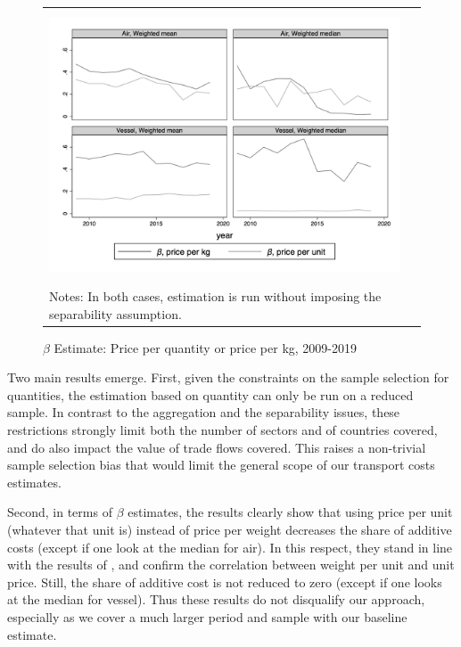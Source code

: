 \documentclass[11pt,twoside, authoryear]{elsarticle}
\begin{document}
\begin{figure}[htbp]
	\caption{$\beta$ Estimate: Price per quantity or price per kg, 2009-2019}
\label{fig:beta_comp_wgt_qty}
	\begin{center}
\begin{tabular}{cc}
	\includegraphics[height=8cm]{../scatter_chronology_non_separe_wgt_non_separe_qy.png}\\
\multicolumn{2}{l}{{\footnotesize Notes: In both cases, estimation is run without imposing the separability assumption.}}
\end{tabular}
	\end{center}
\end{figure}



Two main results emerge. First, given the constraints on the sample selection for quantities, the estimation based on quantity can only be run on a reduced sample. In contrast to the aggregation and the separability issues, these restrictions strongly limit both the number of sectors and of countries covered, and do also impact the value of trade flows covered. This raises a non-trivial sample selection bias that would limit the general scope of our transport costs estimates.

Second, in terms of $\beta$ estimates, the results clearly show that using price per unit (whatever that unit is) instead of price per weight decreases the share of additive costs (except if one look at the median for air). In this respect, they stand in line with the results of \cite{Lashkaripour_JIE2020}, and confirm the correlation between weight per unit and unit price. Still, the share of additive cost is not reduced to zero (except if one looks at the median for vessel). Thus these results do not disqualify our approach, especially as we cover a much larger period and sample with our baseline estimate.
\end{document}
